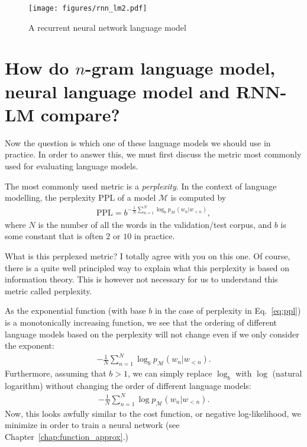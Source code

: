\documentclass{report}
\newcommand{\MM}[0]{\mathcal{M}}
\newcommand{\PPL}{\text{PPL}}
\begin{document}
\begin{figure}[t]
    \centering
    \texttt{[image: figures/rnn\_lm2.pdf]}

    \caption{
        A recurrent neural network language model
    }
    \label{fig:rnn_lm2}
\end{figure}

\section{How do $n$-gram language model, neural language model and RNN-LM
compare?}

Now the question is which one of these language models we should use in practice.
In order to answer this, we must first discuss the metric most commonly used for
evaluating language models.

The most commonly used metric is a {\em perplexity}. In the context of language
modelling, the perplexity $\PPL$ of a model $\MM$ is computed by
\begin{align}
    \label{eq:ppl}
    \PPL = {b}^{-\frac{1}{N} \sum_{n=1}^N \log_{b} p_{\MM}(w_n | w_{<n})},
\end{align}
where $N$ is the number of all the words in the validation/test corpus, and $b$
is some constant that is often $2$ or $10$ in practice. 

What is this perplexed metric? I totally agree with you on this one. Of course,
there is a quite well principled way to explain what this perplexity is based on
information theory. This is however not necessary for us to understand this
metric called perplexity. 

As the exponential function (with base $b$ in the case of perplexity in
Eq.~\eqref{eq:ppl}) is a monotonically increasing function, we see that the
ordering of different language models based on the perplexity will not change
even if we only consider the exponent: 
\begin{align*}
    -\frac{1}{N} \sum_{n=1}^N \log_{b} p_{\MM}(w_n | w_{<n}).
\end{align*}
Furthermore, assuming that $b > 1$, we can simply replace $\log_b$ with $\log$
(natural logarithm) without changing the order of different language models:
\begin{align*}
    -\frac{1}{N} \sum_{n=1}^N \log p_{\MM}(w_n | w_{<n}).
\end{align*}
Now, this looks awfully similar to the cost function, or negative
log-likelihood, we minimize in order to train a neural network (see
Chapter~\ref{chap:function_approx}.)
\end{document}
